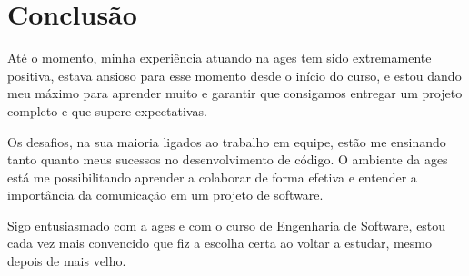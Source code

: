 \section[Conclusão]{Conclusão}

Até o momento, minha experiência atuando na \ac{ages} tem sido extremamente positiva, estava ansioso para esse momento desde o início do curso, e estou dando meu máximo para aprender muito e garantir que consigamos entregar um projeto completo e que supere expectativas.

Os desafios, na sua maioria ligados ao trabalho em equipe, estão me ensinando tanto quanto meus sucessos no desenvolvimento de código. O ambiente da \ac{ages} está me possibilitando aprender a colaborar de forma efetiva e entender a importância da comunicação em um projeto de software.

Sigo entusiasmado com a \ac{ages} e com o curso de Engenharia de Software, estou cada vez mais convencido que fiz a escolha certa ao voltar a estudar, mesmo depois de mais velho.
